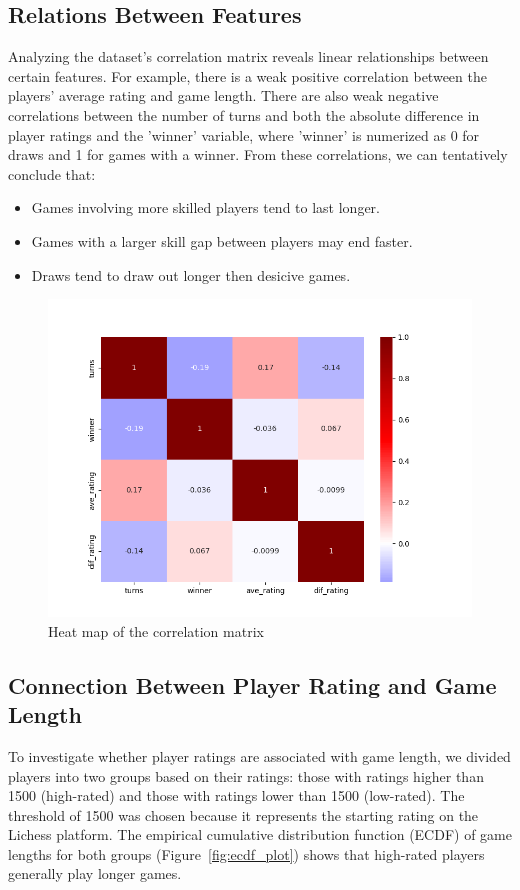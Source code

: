 \documentclass[conference]{IEEEtran}
\begin{document}
\subsection{Relations Between Features}
Analyzing the dataset’s correlation matrix reveals linear relationships between certain features. For example, there is a weak positive correlation between the players' average rating and game length. There are also weak negative correlations between the number of turns and both the absolute difference in player ratings and the 'winner' variable, where 'winner' is numerized as 0 for draws and 1 for games with a winner. From these correlations, we can tentatively conclude that:
\begin{itemize}
    \item Games involving more skilled players tend to last longer.
 
    \item Games with a larger skill gap between players may end faster.

    \item Draws tend to draw out longer then desicive games.
\end{itemize}

\begin{figure}[H]
    \centering
    \includegraphics[width=0.8\linewidth]{corr_mat.png}
    \caption{Heat map of the correlation matrix}
    \label{fig:corr_mat}
\end{figure}

\subsection{Connection Between Player Rating and Game Length}
To investigate whether player ratings are associated with game length, we divided players into two groups based on their ratings: those with ratings higher than 1500 (high-rated) and those with ratings lower than 1500 (low-rated). The threshold of 1500 was chosen because it represents the starting rating on the Lichess platform. The empirical cumulative distribution function (ECDF) of game lengths for both groups (Figure~\ref{fig:ecdf_plot}) shows that high-rated players generally play longer games.
\end{document}
